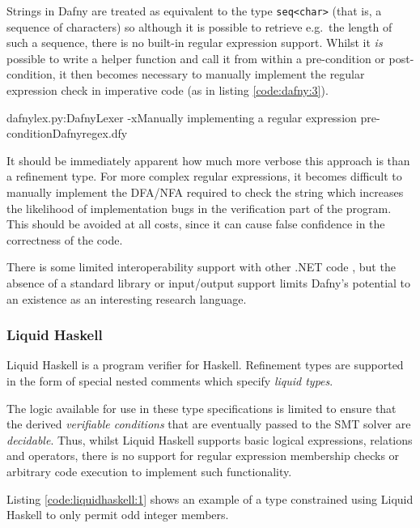 \documentclass[a4paper,openany,12pt]{book}
\begin{document}
Strings in Dafny are treated as equivalent to the type \texttt{seq<char>} (that is, a sequence of characters) so
although it is possible to retrieve e.g.\ the length of such a sequence, there is no built-in regular expression support.
Whilst it \emph{is} possible to write a helper function and call it from within a pre-condition or post-condition, it
then becomes necessary to manually implement the regular expression check in imperative code (as in listing \ref{code:dafny:3}).

\begin{mycodefile}{dafnylex.py:DafnyLexer -x}{\label{code:dafny:3}Manually implementing a regular expression pre-condition}{Dafny}{regex.dfy}
    
    It should be immediately apparent how much more verbose this approach is than a refinement type.
    For more complex regular expressions, it becomes difficult to manually implement the DFA/NFA required to check the
    string which increases the likelihood of implementation bugs in the verification part of the program.
    This should be avoided at all costs, since it can cause false confidence in the correctness of the code.

    \vspace{0.5em}
\end{mycodefile}


There is some limited interoperability support with other .NET code \citep{wilcowio}, but the absence of a standard
library or input/output support limits Dafny's potential to an existence as an interesting research language.

\subsubsection{Liquid Haskell}
\label{lh}
Liquid Haskell is a program verifier for Haskell.
Refinement types are supported in the form of special nested comments which specify \emph{liquid types}.

The logic available for use in these type specifications is limited to ensure that the derived \emph{verifiable
conditions} that are eventually passed to the SMT solver are \emph{decidable}.
Thus, whilst Liquid Haskell supports basic logical expressions, relations and operators, there is no support for regular
expression membership checks or arbitrary code execution to implement such functionality.

Listing \ref{code:liquidhaskell:1} shows an example of a type constrained using Liquid Haskell to only permit odd
integer members.
\end{document}
